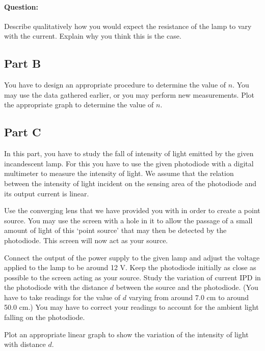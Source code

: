 \begin{question}
\paragraph{Question:} Describe qualitatively how you would expect the resistance of the lamp to vary with the current. Explain why you think this is the case.
\end{question}

\subsection*{Part B}

You have to design an appropriate procedure to determine the value of $n$. You may use the data gathered earlier, or you may perform new measurements. Plot the appropriate graph to determine the value of $n$.

\subsection*{Part C}

In this part, you have to study the fall of intensity of light emitted by the given incandescent lamp.  For this you have to use the given photodiode with a digital multimeter to measure the intensity of light. We assume that the relation between the intensity of light incident on the sensing area of the photodiode and its output current is linear. 

Use the converging lens that we have provided you with in order to create a point source. You may use the screen with a hole in it to allow the passage of a small amount of light of this `point source' that may then be detected by the photodiode. This screen will now act as your source.

Connect the output of the power supply to the given lamp and adjust the voltage applied to the lamp to be around 12 V. Keep the photodiode initially as close as possible to the screen acting as your source.  Study the variation of current IPD in the photodiode with the distance $d$ between the source and the photodiode. (You have to take readings for the value of $d$ varying from around 7.0 cm to around 50.0 cm.) You may have to correct your readings to account for the ambient light falling on the photodiode. 

Plot an appropriate linear graph to show the variation of the intensity of light with distance $d$.

